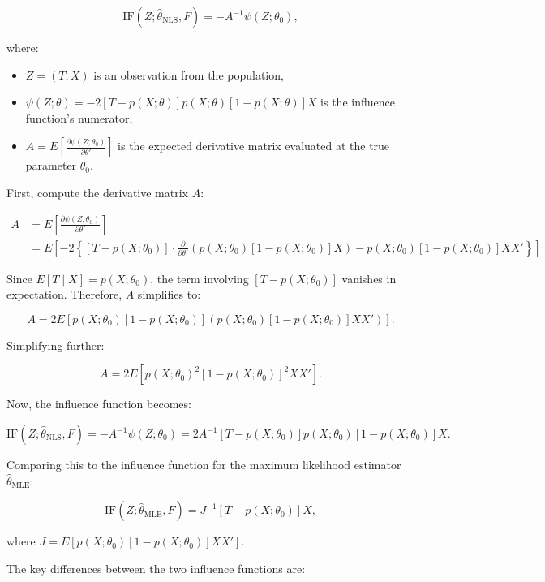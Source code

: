 \documentclass{article}
\begin{document}
\[
\text{IF}(Z; \hat{\theta}_{\text{NLS}}, F) = -A^{-1} \psi(Z; \theta_0),
\]

where:

\begin{itemize}
    \item \( Z = (T, X) \) is an observation from the population,
    \item \( \psi(Z; \theta) = -2 \left[ T - p(X; \theta) \right] p(X; \theta) [1 - p(X; \theta)] X \) is the influence function's numerator,
    \item \( A = E \left[ \frac{\partial \psi(Z; \theta_0)}{\partial \theta'} \right] \) is the expected derivative matrix evaluated at the true parameter \( \theta_0 \).
\end{itemize}

First, compute the derivative matrix \( A \):

\begin{align*}
  A
  &= E \left[ \frac{\partial \psi(Z; \theta_0)}{\partial \theta'} \right] \\
  &= E \left[ -2 \left\{ [T - p(X; \theta_0)] \cdot \frac{\partial}{\partial \theta'} \left( p(X; \theta_0) [1 - p(X; \theta_0)] X \right) - p(X; \theta_0) [1 - p(X; \theta_0)] X X' \right\} \right]
\end{align*}

Since \( E[T \mid X] = p(X; \theta_0) \), the term involving \( [T - p(X; \theta_0)] \) vanishes in expectation. Therefore, \( A \) simplifies to:

\[
A = 2 E \left[ p(X; \theta_0) [1 - p(X; \theta_0)] \left( p(X; \theta_0) [1 - p(X; \theta_0)] X X' \right) \right].
\]

Simplifying further:

\[
A = 2 E \left[ p(X; \theta_0)^2 [1 - p(X; \theta_0)]^2 X X' \right].
\]

Now, the influence function becomes:

\[
\text{IF}(Z; \hat{\theta}_{\text{NLS}}, F) = -A^{-1} \psi(Z; \theta_0) = 2 A^{-1} [T - p(X; \theta_0)] p(X; \theta_0) [1 - p(X; \theta_0)] X.
\]

Comparing this to the influence function for the maximum likelihood estimator \( \hat{\theta}_{\text{MLE}} \):

\[
\text{IF}(Z; \hat{\theta}_{\text{MLE}}, F) = J^{-1} [T - p(X; \theta_0)] X,
\]

where \( J = E \left[ p(X; \theta_0) [1 - p(X; \theta_0)] X X' \right] \).

The key differences between the two influence functions are:
\end{document}
